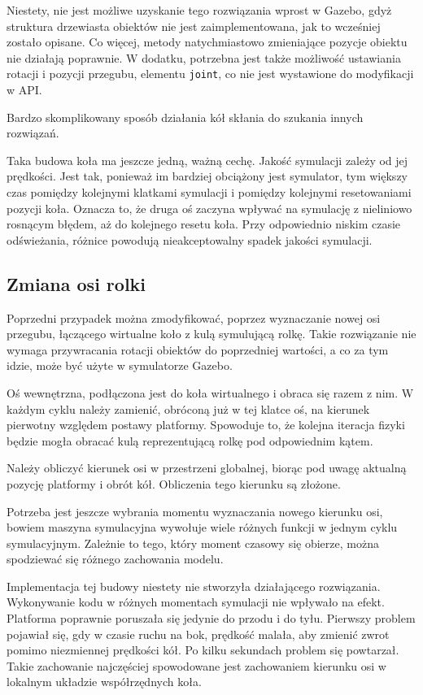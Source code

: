 		Niestety, nie jest możliwe uzyskanie tego rozwiązania wprost w Gazebo, gdyż struktura drzewiasta obiektów nie jest zaimplementowana, jak to wcześniej zostało opisane.
		Co więcej, metody natychmiastowo zmieniające pozycje obiektu nie działają poprawnie.
		W dodatku, potrzebna jest także możliwość ustawiania rotacji i pozycji przegubu, elementu \texttt{joint}, co nie jest wystawione do modyfikacji w API.

		Bardzo skomplikowany sposób działania kół skłania do szukania innych rozwiązań.

		Taka budowa koła ma jeszcze jedną, ważną cechę. 
		Jakość symulacji zależy od jej prędkości.
		Jest tak, ponieważ im bardziej obciążony jest symulator, tym większy czas pomiędzy kolejnymi klatkami symulacji i pomiędzy kolejnymi resetowaniami pozycji koła.
		Oznacza to, że druga oś zaczyna wpływać na symulację z nieliniowo rosnącym błędem, aż do kolejnego resetu koła.
		Przy odpowiednio niskim czasie odświeżania, różnice powodują nieakceptowalny spadek jakości symulacji.

	\subsection{Zmiana osi rolki}
		Poprzedni przypadek można zmodyfikować, poprzez wyznaczanie nowej osi przegubu, łączącego wirtualne koło z kulą symulującą rolkę.
		Takie rozwiązanie nie wymaga przywracania rotacji obiektów do poprzedniej wartości, a co za tym idzie, może być użyte w symulatorze Gazebo.

		Oś wewnętrzna, podłączona jest do koła wirtualnego i obraca się razem z nim.
		W każdym cyklu należy zamienić, obróconą już w tej klatce oś, na kierunek pierwotny względem postawy platformy.
		Spowoduje to, że kolejna iteracja fizyki będzie mogła obracać kulą reprezentującą rolkę pod odpowiednim kątem.

		Należy obliczyć kierunek osi w przestrzeni globalnej, biorąc pod uwagę aktualną pozycję platformy i obrót kół.
		Obliczenia tego kierunku są złożone.

		Potrzeba jest jeszcze wybrania momentu wyznaczania nowego kierunku osi, bowiem maszyna symulacyjna wywołuje wiele różnych funkcji w jednym cyklu symulacyjnym.
		Zależnie to tego, który moment czasowy się obierze, można spodziewać się różnego zachowania modelu.

		Implementacja tej budowy niestety nie stworzyła działającego rozwiązania.
		Wykonywanie kodu w różnych momentach symulacji nie wpływało na efekt.
		Platforma poprawnie poruszała się jedynie do przodu i do tyłu. 
		Pierwszy problem pojawiał się, gdy w czasie ruchu na bok, prędkość malała, aby zmienić zwrot pomimo niezmiennej prędkości kół.
		Po kilku sekundach problem się powtarzał. Takie zachowanie najczęściej spowodowane jest zachowaniem kierunku osi w lokalnym układzie współrzędnych koła.

